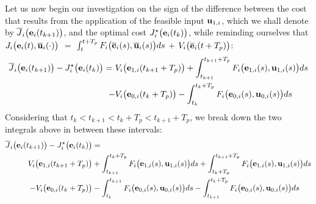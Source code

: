 Let us now begin our investigation on the sign of the difference between the cost
that results from the application of the feasible input $\bm{\mathbf{u}}_{1,i}$,
which we shall denote by $\overline{J}_i\big(\bm{\mathbf{e}}_i(t_{k+1})\big)$,
and the optimal cost $J_i^{\star}\big(\bm{\mathbf{e}}_i(t_k)\big)$, while reminding
ourselves that
$J_i \big(\bm{\mathbf{e}}_i(t), \overline{\bm{\mathbf{u}}}_i (\cdot)\big)$ $=$
$\int_{t}^{t + T_p} F_i \big(\overline{\bm{\mathbf{e}}}_i(s), \overline{\bm{\mathbf{u}}}_i (s)\big) ds$ $+$
$V_i \big(\overline{\bm{\mathbf{e}}}_i (t + T_p)\big)$:
\begin{align}
  \overline{J}_i\big(\bm{\mathbf{e}}_i(t_{k+1})\big) - J_i^{\star}\big(\bm{\mathbf{e}}_i(t_k)\big) =\
   & V_i \big(\bm{\mathbf{e}}_{1,i} (t_{k+1} + T_p)\big) + \int_{t_{k+1}}^{t_{k+1} + T_p} F_i \big(\bm{\mathbf{e}}_{1,i}(s), \bm{\mathbf{u}}_{1,i} (s)\big) ds \\
  -&V_i \big(\bm{\mathbf{e}}_{0,i} (t_k + T_p)\big) - \int_{t_k}^{t_k + T_p} F_i \big(\bm{\mathbf{e}}_{0,i}(s), \bm{\mathbf{u}}_{0,i} (s)\big) ds
\end{align}
Considering that $t_k < t_{k+1} < t_k + T_p < t_{k+1} + T_p$, we break down the
two integrals above in between these intervals:
\begin{align}
  \overline{J}_i\big(\bm{\mathbf{e}}_i(t_{k+1})\big) - J_i^{\star}\big(\bm{\mathbf{e}}_i(t_k)\big) &= \\
    V_i \big(\bm{\mathbf{e}}_{1,i} (t_{k+1} + T_p)\big)
    &+ \int_{t_{k+1}}^{t_k + T_p} F_i \big(\bm{\mathbf{e}}_{1,i}(s), \bm{\mathbf{u}}_{1,i} (s)\big) d s
    + \int_{t_k + T_p}^{t_{k+1} + T_p} F_i \big(\bm{\mathbf{e}}_{1,i}(s), \bm{\mathbf{u}}_{1,i} (s)\big) d s \\
    -V_i \big(\bm{\mathbf{e}}_{0,i} (t_k + T_p)\big)
    &- \int_{t_k}^{t_{k+1}} F_i \big(\bm{\mathbf{e}}_{0,i}(s), \bm{\mathbf{u}}_{0,i} (s)\big) d s
    - \int_{t_{k+1}}^{t_k + T_p} F_i \big(\bm{\mathbf{e}}_{0,i}(s), \bm{\mathbf{u}}_{0,i} (s)\big) d s
\label{eq:convergence_4_integrals_2}
\end{align}

